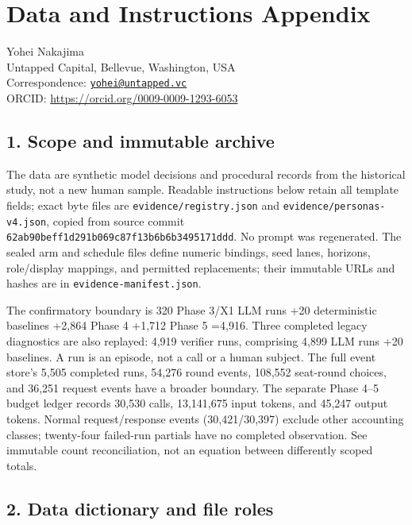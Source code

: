 \documentclass[11pt]{article}
\begin{document}
\section{Data and Instructions
Appendix}\label{data-and-instructions-appendix}

Yohei Nakajima\\
Untapped Capital, Bellevue, Washington, USA\\
Correspondence:
\href{mailto:yohei@untapped.vc}{\nolinkurl{yohei@untapped.vc}}\\
ORCID: \url{https://orcid.org/0009-0009-1293-6053}

\subsection{1. Scope and immutable
archive}\label{scope-and-immutable-archive}

The data are synthetic model decisions and procedural records from the
historical study, not a new human sample. Readable instructions below
retain all template fields; exact byte files are
\texttt{evidence/registry.json} and \texttt{evidence/personas-v4.json},
copied from source commit
\nolinkurl{62ab90beff1d291b069c87f13b6b6b3495171ddd}. No prompt was
regenerated. The sealed arm and schedule files define numeric bindings,
seed lanes, horizons, role/display mappings, and permitted replacements;
their immutable URLs and hashes are in \texttt{evidence-manifest.json}.

The confirmatory boundary is 320 Phase 3/X1 LLM runs +20 deterministic
baselines +2,864 Phase 4 +1,712 Phase 5 =4,916. Three completed legacy
diagnostics are also replayed: 4,919 verifier runs, comprising 4,899 LLM
runs +20 baselines. A run is an episode, not a call or a human subject.
The full event store's 5,505 completed runs, 54,276 round events,
108,552 seat-round choices, and 36,251 request events have a broader
boundary. The separate Phase 4--5 budget ledger records 30,530 calls,
13,141,675 input tokens, and 45,247 output tokens. Normal
request/response events (30,421/30,397) exclude other accounting
classes; twenty-four failed-run partials have no completed observation.
See immutable count reconciliation, not an equation between differently
scoped totals.

\subsection{2. Data dictionary and file
roles}\label{data-dictionary-and-file-roles}
\end{document}
